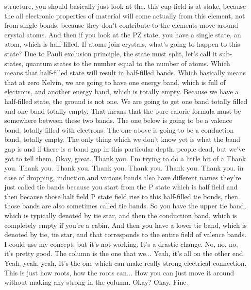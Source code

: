 structure, you should basically just look at the, this cup field is at stake, because the all electronic properties of material will come actually from this element, not from single bonds, because they don't contribute to the elements move around crystal atoms. And then if you look at the PZ state, you have a single state, an atom, which is half-filled. If atoms join crystals, what's going to happen to this state? Due to Pauli exclusion principle, the state must split, let's call it sub-states, quantum states to the number equal to the number of atoms. Which means that half-filled state will result in half-filled bands. Which basically means that at zero Kelvin, we are going to have one energy band, which is full of electrons, and another energy band, which is totally empty. Because we have a half-filled state, the ground is not one. We are going to get one band totally filled and one band totally empty. That means that the pure calorie formula must be somewhere between these two bands. The one below is going to be a valence band, totally filled with electrons. The one above is going to be a conduction band, totally empty. The only thing which we don't know yet is what the band gap is and if there is a band gap in this particular depth. people dead, but we've got to tell them. Okay, great. Thank you. I'm trying to do a little bit of a Thank you. Thank you. Thank you. Thank you. Thank you. Thank you. Thank you. in case of dropping, induction and various bands also have different names they're just called tie bands because you start from the P state which is half field and then because those half field P state field rise to this half-filled tie bonds, then those bands are also sometimes called tie bands. So you have the upper tie band, which is typically denoted by tie star, and then the conduction band, which is completely empty if you're a cabin. And then you have a lower tie band, which is denoted by tie, tie star, and that corresponds to the entire field of valence bands. I could use my concept, but it's not working. It's a drastic change. No, no, no, it's pretty good. The column is the one that we... Yeah, it's all on the other end. Yeah, yeah, yeah. It's the one which can make really strong electrical connection. This is just how roots, how the roots can... How you can just move it around without making any strong in the column. Okay? Okay. Fine.
